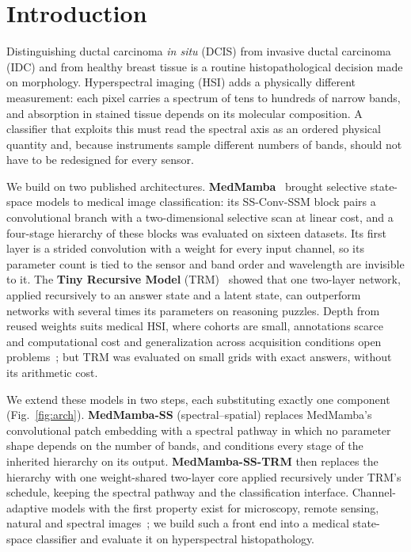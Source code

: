 \documentclass{svproc}
\begin{document}
\section{Introduction}
Distinguishing ductal carcinoma \emph{in situ} (DCIS) from invasive ductal carcinoma (IDC) and from healthy breast tissue is a routine histopathological decision made on morphology. Hyperspectral imaging (HSI) adds a physically different measurement: each pixel carries a spectrum of tens to hundreds of narrow bands, and absorption in stained tissue depends on its molecular composition. A classifier that exploits this must read the spectral axis as an ordered physical quantity and, because instruments sample different numbers of bands, should not have to be redesigned for every sensor.

We build on two published architectures. \textbf{MedMamba}~\cite{medmamba} brought selective state-space models to medical image classification: its SS-Conv-SSM block pairs a convolutional branch with a two-dimensional selective scan at linear cost, and a four-stage hierarchy of these blocks was evaluated on sixteen datasets. Its first layer is a strided convolution with a weight for every input channel, so its parameter count is tied to the sensor and band order and wavelength are invisible to it. The \textbf{Tiny Recursive Model} (TRM)~\cite{trm} showed that one two-layer network, applied recursively to an answer state and a latent state, can outperform networks with several times its parameters on reasoning puzzles. Depth from reused weights suits medical HSI, where cohorts are small, annotations scarce~\cite{lu2014,pandey2026} and computational cost and generalization across acquisition conditions open problems~\cite{fatima2025}; but TRM was evaluated on small grids with exact answers, without its arithmetic cost.

We extend these models in two steps, each substituting exactly one component (Fig.~\ref{fig:arch}). \textbf{MedMamba-SS} (spectral--spatial) replaces MedMamba's convolutional patch embedding with a spectral pathway in which no parameter shape depends on the number of bands, and conditions every stage of the inherited hierarchy on its output. \textbf{MedMamba-SS-TRM} then replaces the hierarchy with one weight-shared two-layer core applied recursively under TRM's schedule, keeping the spectral pathway and the classification interface. Channel-adaptive models with the first property exist for microscopy, remote sensing, natural and spectral images~\cite{channelvit,dofa,batformer,carl}; we build such a front end into a medical state-space classifier and evaluate it on hyperspectral histopathology.
\end{document}
